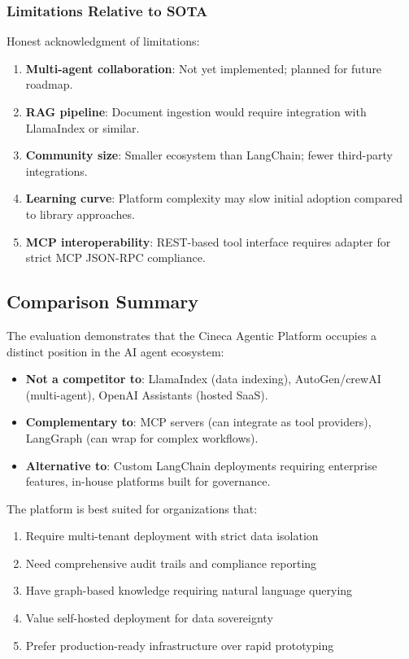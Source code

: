 \subsubsection{Limitations Relative to SOTA}

Honest acknowledgment of limitations:

\begin{enumerate}
    \item \textbf{Multi-agent collaboration}: Not yet implemented; planned for future roadmap.
    
    \item \textbf{RAG pipeline}: Document ingestion would require integration with LlamaIndex or similar.
    
    \item \textbf{Community size}: Smaller ecosystem than LangChain; fewer third-party integrations.
    
    \item \textbf{Learning curve}: Platform complexity may slow initial adoption compared to library approaches.
    
    \item \textbf{MCP interoperability}: REST-based tool interface requires adapter for strict MCP JSON-RPC compliance.
\end{enumerate}

\subsection{Comparison Summary}

The evaluation demonstrates that the Cineca Agentic Platform occupies a distinct position in the AI agent ecosystem:

\begin{itemize}
    \item \textbf{Not a competitor to}: LlamaIndex (data indexing), AutoGen/crewAI (multi-agent), OpenAI Assistants (hosted SaaS).
    
    \item \textbf{Complementary to}: MCP servers (can integrate as tool providers), LangGraph (can wrap for complex workflows).
    
    \item \textbf{Alternative to}: Custom LangChain deployments requiring enterprise features, in-house platforms built for governance.
\end{itemize}

The platform is best suited for organizations that:
\begin{enumerate}
    \item Require multi-tenant deployment with strict data isolation
    \item Need comprehensive audit trails and compliance reporting
    \item Have graph-based knowledge requiring natural language querying
    \item Value self-hosted deployment for data sovereignty
    \item Prefer production-ready infrastructure over rapid prototyping
\end{enumerate}

